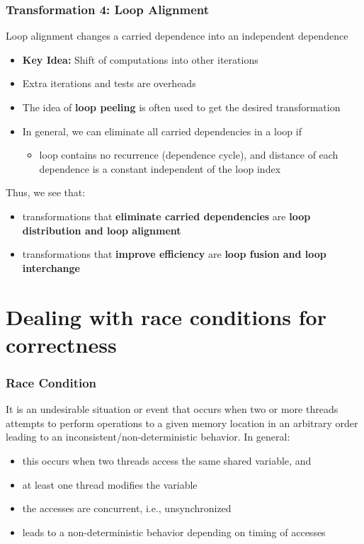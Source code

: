 \documentclass[12pt, a4paper]{report}
\begin{document}
\subsubsection{Transformation 4: Loop Alignment}
Loop alignment changes a carried dependence into an independent dependence
\begin{itemize}
    \item {\bfseries{Key Idea:}} Shift of computations into other iterations
    \item Extra iterations and tests are overheads
    \item The idea of {\bfseries{loop peeling}} is often used to get the desired transformation
    \item In general, we can eliminate all carried dependencies in a loop if
    \begin{itemize}
        \item loop contains no recurrence (dependence cycle), and distance of each dependence is a constant independent of the loop index
    \end{itemize}
\end{itemize}

Thus, we see that:
\begin{itemize}
    \item transformations that {\bfseries{eliminate carried dependencies}} are {\bfseries{loop distribution and loop alignment}}
    \item transformations that {\bfseries{improve efficiency}} are {\bfseries{loop fusion and loop interchange}}
\end{itemize}

\section{Dealing with race conditions for correctness}
\subsubsection{Race Condition}
It is an undesirable situation or event that occurs when two or more threads attempts to perform operations to a given memory location in an arbitrary order
leading to an inconsistent/non-deterministic behavior. In general:
\begin{itemize}
    \item this occurs when two threads access the same shared variable, and
    \item at least one thread modifies the variable
    \item the accesses are concurrent, i.e., unsynchronized
    \item leads to a non-deterministic behavior depending on timing of accesses
\end{itemize}
\end{document}
